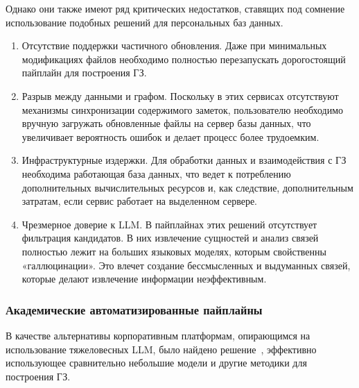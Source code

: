 Однако они также имеют ряд критических недостатков, ставящих
под сомнение использование подобных решений для персональных баз данных.
\begin{enumerate}
      \item Отсутствие поддержки частичного обновления. Даже при минимальных модификациях
            файлов необходимо полностью перезапускать дорогостоящий пайплайн для построения ГЗ.
      \item Разрыв между данными и графом. Поскольку в этих сервисах отсутствуют
            механизмы синхронизации содержимого заметок, пользователю необходимо
            вручную загружать обновленные файлы на сервер базы данных,
            что увеличивает вероятность ошибок
            и делает процесс более трудоемким.
      \item Инфраструктурные издержки. Для обработки данных и взаимодействия с ГЗ необходима
            работающая база данных, что ведет к потреблению дополнительных вычислительных ресурсов
            и, как следствие, дополнительным затратам, если сервис работает на выделенном сервере.
      \item Чрезмерное доверие к LLM. В пайплайнах этих решений отсутствует фильтрация кандидатов.
            В них извлечение сущностей и анализ связей
            полностью лежит на больших языковых моделях, которым свойственны «галлюцинации».
            Это влечет создание бессмысленных и выдуманных связей,
            которые делают извлечение информации неэффективным.
\end{enumerate}

\subsubsection*{Академические автоматизированные пайплайны}
В качестве альтернативы корпоративным платформам, опирающимся на
использование тяжеловесных LLM, было найдено решение~\cite{Ain_2025},
эффективно использующее сравнительно небольшие модели и другие
методики для построения ГЗ.


